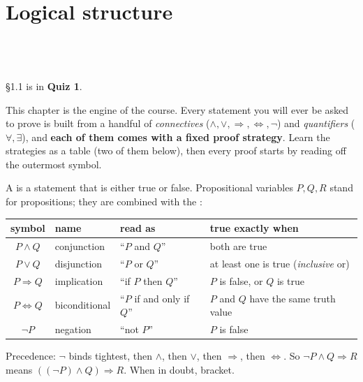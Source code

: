 \chapter{Logical structure}
%
{\\ \\ \\ \S1.1 is in \textbf{Quiz 1}.}

This chapter is the engine of the course. Every statement you will ever be asked to prove is built from a handful of \emph{connectives} ($\wedge,\vee,\Rightarrow,\Leftrightarrow,\neg$) and \emph{quantifiers} ($\forall,\exists$), and \textbf{each of them comes with a fixed proof strategy}. Learn the strategies as a table (two of them below), then every proof starts by reading off the outermost symbol.


\begin{key}
A  is a statement that is either true or false. Propositional variables $P,Q,R$ stand for propositions; they are combined with the :
\begin{center}\small
\begin{tabular}{@{}c l l l@{}}
\toprule
symbol & name & read as & true exactly when\\
\midrule
$P\wedge Q$ & conjunction & ``$P$ and $Q$'' & both are true\\
$P\vee Q$ & disjunction & ``$P$ or $Q$'' & at least one is true (\emph{inclusive} or)\\
$P\Rightarrow Q$ & implication & ``if $P$ then $Q$'' & $P$ is false, or $Q$ is true\\
$P\Leftrightarrow Q$ & biconditional & ``$P$ if and only if $Q$'' & $P$ and $Q$ have the same truth value\\
$\neg P$ & negation & ``not $P$'' & $P$ is false\\
\bottomrule
\end{tabular}
\end{center}
Precedence: $\neg$ binds tightest, then $\wedge$, then $\vee$, then $\Rightarrow$, then $\Leftrightarrow$. So $\neg P\wedge Q\Rightarrow R$ means $((\neg P)\wedge Q)\Rightarrow R$. When in doubt, bracket.
\end{key}

